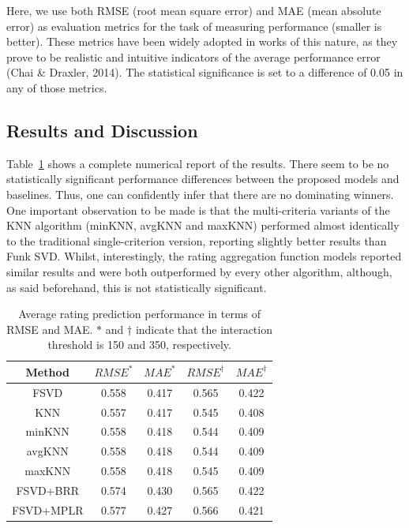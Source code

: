 \documentclass[sigconf,authordraft]{acmart}
\begin{document}
Here, we use both RMSE (root mean square error) and MAE (mean absolute error) as evaluation metrics for the task of measuring performance (smaller is better). These metrics have been widely adopted in works of this nature, as they prove to be realistic and intuitive indicators of the average performance error (Chai \& Draxler, 2014). The statistical significance is set to a difference of 0.05 in any of those metrics.

\subsection{Results and Discussion}

Table~\ref{tab:results} shows a complete numerical report of the results. There seem to be no statistically significant performance differences between the proposed models and baselines. Thus, one can confidently infer that there are no dominating winners. One important observation to be made is that the multi-criteria variants of the KNN algorithm (minKNN, avgKNN and maxKNN) performed almost identically to the traditional single-criterion version, reporting slightly better results than Funk SVD. Whilst, interestingly, the rating aggregation function models reported similar results and were both outperformed by every other algorithm, although, as said beforehand, this is not statistically significant.

\begin{table}[h]
\caption{Average rating prediction performance in terms of RMSE and MAE. $\ast$ and $\dagger$ indicate that the interaction threshold is 150 and 350, respectively.}
\begin{tabular}{@{}c||cc|cc@{}}
\toprule
Method    & $RMSE^\ast$ & $MAE^\ast$ & $RMSE^\dagger$  & $MAE^\dagger$ \\ \midrule
FSVD      & 0.558       & 0.417      & 0.565           & 0.422         \\
KNN       & 0.557       & 0.417      & 0.545           & 0.408         \\
minKNN    & 0.558       & 0.418      & 0.544           & 0.409         \\
avgKNN    & 0.558       & 0.418      & 0.544           & 0.409         \\
maxKNN    & 0.558       & 0.418      & 0.545           & 0.409         \\
FSVD+BRR  & 0.574       & 0.430      & 0.565           & 0.422         \\
FSVD+MPLR & 0.577       & 0.427      & 0.566           & 0.421         \\ \bottomrule
\end{tabular}
\label{tab:results}
\end{table}
\end{document}
